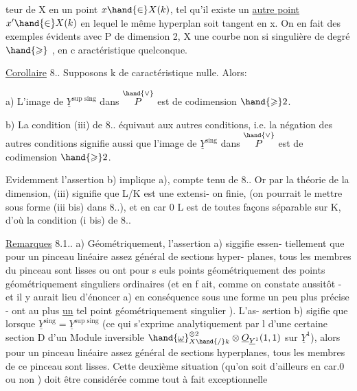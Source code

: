 
teur de X en un point $x\hand{\in} X(k)$,  tel qu'il existe un \uline{autre point}
$x'\hand{\in} X(k)$ en lequel le même hyperplan soit tangent en x. On en fait des
exemples évidents avec  P de dimension 2, X une courbe non si
singulière de degré $\hand{\geqslant}$  , en c aractéristique quelconque. 

\uline{Corollaire} 8.. Supposons k de caractéristique nulle. Alors:

a) L'image de $\underline{Y}^{\text{sup sing}}$ dans $\overset{\hand{\vee}}{P}$ est de codimension $\hand{\geqslant} 2$.

b) La condition (iii) de 8.. équivaut aux autres conditions, i.e.
la négation des autres conditions\hand{,}  signifie aussi que l'image de $\underline{Y}^{\text{sing}}$
dans $\overset{\hand{\vee}}{P}$ est de codimension $\hand{\geqslant} 2$.

Evidemment l'assertion b) implique a), compte tenu de 8.. Or
par la théorie de la dimension, (iii) signifie que L/K est une extensi-%
on finie,  (on pourrait le mettre sous forme (iii bis) dans 8..),
et en car 0  L est de toutes façons séparable sur K, d'où
la condition (i bis) de 8..

\uline{Remarques} 8.1.. a) Géométriquement, l'assertion a) siggifie essen-%
tiellement que pour un pinceau linéaire assez général de sections hyper-%
planes, tous les membres du pinceau sont lisses ou ont 
 pour s euls points géométriquement des points géométriquement
singuliers ordinaires (et en f ait, comme on constate aussitôt - et il
y aurait lieu d'énoncer a) en conséquence sous une forme un peu plus
précise - ont au plus \uline{un} tel point géométriquement singulier ). L'as-%
sertion b) sigifie  que lorsque $\underline{Y}^{\text{sing}}=\underline{Y}^{\text{sup sing}}$ (ce qui s'exprime
analytiquement par l  d'une certaine section D d'un Module
inversible $\hand{\underline{\omega}}^{\otimes 2}_{X\hand{/}k}\otimes\underline{O}_{\underline{Y}^1}(1,1)$ sur $\underline{Y}^1$), alors pour un pinceau linéaire
assez général de sections hyperplanes, tous les membres de ce 
pinceau sont lisses. Cette deuxième situation (qu'on soit d'ailleurs
en car.0 ou non ) doit être considérée comme tout à fait exceptionnelle

